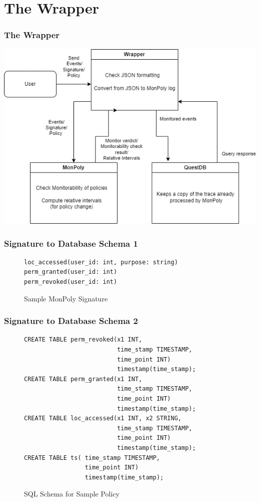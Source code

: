 \section{The Wrapper}

\begin{frame}
    \frametitle{The Wrapper}
    \centering
    \includegraphics[width=0.9\linewidth]{diagrams/wrapper.png}
\end{frame}

\begin{frame}[fragile]
    \frametitle{Signature to Database Schema 1}

\begin{figure}[H]
    \label{fig:example-signature}
\begin{verbatim}
loc_accessed(user_id: int, purpose: string)
perm_granted(user_id: int)
perm_revoked(user_id: int)
\end{verbatim}
    \caption{Sample MonPoly Signature}
\end{figure}
    
\end{frame}

\begin{frame}[fragile]
    \frametitle{Signature to Database Schema 2}
\begin{figure}[H]
    \label{fig:example-policy-schema}
\begin{verbatim}
CREATE TABLE perm_revoked(x1 INT,
                          time_stamp TIMESTAMP,
                          time_point INT) 
                          timestamp(time_stamp);
CREATE TABLE perm_granted(x1 INT,
                          time_stamp TIMESTAMP,
                          time_point INT) 
                          timestamp(time_stamp);
CREATE TABLE loc_accessed(x1 INT, x2 STRING,
                          time_stamp TIMESTAMP,
                          time_point INT) 
                          timestamp(time_stamp);
CREATE TABLE ts( time_stamp TIMESTAMP,
                 time_point INT) 
                 timestamp(time_stamp);
\end{verbatim}
    \caption{SQL Schema for Sample Policy}
\end{figure}
\end{frame}